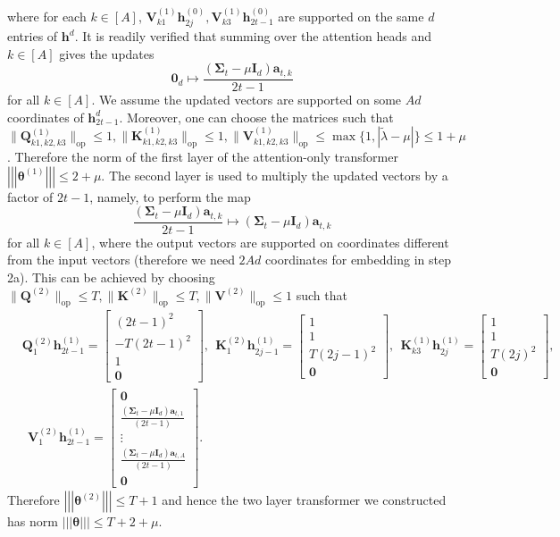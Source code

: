 \documentclass[10pt]{article}
\newcommand{\id}{\bI}
\newcommand{\lops}[1]{\|{#1}\|_{\mathrm{op}}}
\newcommand{\<}{\left\langle}
\renewcommand{\>}{\right\rangle}
\renewcommand{\bQ}{\mathbf{Q}}
\newcommand{\bzero}{{\mathbf 0}}
\newcommand{\nrmp}[1]{{\left|\!\left|\!\left|{#1}\right|\!\right|\!\right|}}
\newcommand{\partd}{{d}}
\newcommand{\Tpscov}{{{\mathbf\Sigma}}}
\newcommand{\prodeig}{{\mu}}
\def\bI{{\mathbf I}}
\def\bK{{\mathbf K}}
\def\bQ{{\mathbf Q}}
\def\bV{{\mathbf V}}
\def\btheta{{\boldsymbol \theta}}
\def\ba{{\mathbf a}}
\def\bh{{\mathbf h}}
\begin{document}
where for each $k\in[A]$, $\bV^{(1)}_{k1}\bh^{(0)}_{2j},\bV^{(1)}_{k3}\bh^{(0)}_{2t-1}$ are supported on the same $d$ entries of $\bh^\partd$.
It is readily verified that  summing over the attention heads and $k\in[A]$ gives the updates
$$ \bzero_d\mapsto\frac{(\Tpscov_t-\prodeig\id_d)\ba_{t,k}}{2t-1}$$ for all $k\in[A]$. We assume the updated vectors are supported on some $Ad$ coordinates of $\bh_{2t-1}^d$. Moreover, one can choose the matrices such that $\lops{\bQ^{(1)}_{k1,k2,k3}}\leq1,\lops{\bK^{(1)}_{k1,k2,k3}}\leq1,\lops{\bV^{(1)}_{k1,k2,k3}}\leq \max\{1,|\tilde\lambda-\prodeig|\}\leq1+\prodeig$. Therefore the norm of the first layer of the attention-only transformer $\nrmp{\btheta^{(1)}}\leq 2+\prodeig$.
The second layer is used to multiply the updated vectors by a factor of $2t-1$, namely, to perform the map
$$ \frac{(\Tpscov_t-\prodeig\id_d)\ba_{t,k}}{2t-1}\mapsto{(\Tpscov_t-\prodeig\id_d)\ba_{t,k}}$$ for all $k\in[A]$, where the output vectors are supported on coordinates different from the input vectors (therefore we need $2Ad$ coordinates for embedding in step 2a). This can be achieved by choosing $\lops{\bQ^{(2)}}\leq T, \lops{\bK^{(2)}}\leq T, \lops{\bV^{(2)}}\leq1$
such that \begin{align*}
    &
    \bQ^{(2)}_{1}\bh^{(1)}_{2t-1}=\begin{bmatrix}
         (2t-1)^2\\-T(2t-1)^2\\  1\\ \bzero
    \end{bmatrix},~~ \bK^{(2)}_{1}\bh^{(1)}_{2j-1}=\begin{bmatrix}
        1\\1\\ T(2j-1)^2\\\bzero
    \end{bmatrix},~~
    \bK^{(1)}_{k3}\bh^{(1)}_{2j}=\begin{bmatrix}
      1\\  1\\  T(2j)^2\\\bzero
    \end{bmatrix},\\&~~ \bV^{(2)}_{1}\bh^{(1)}_{2t-1}=\begin{bmatrix}
        \bzero\\ \frac{(\Tpscov_t-\prodeig\id_d)\ba_{t,1}}{(2t-1)}
\\\vdots\\
        \frac{(\Tpscov_t-\prodeig\id_d)\ba_{t,A}}{(2t-1)} \\ \bzero
    \end{bmatrix}.
\end{align*} Therefore $\nrmp{\btheta^{(2)}}\leq T+1$ and hence the two layer transformer we constructed has norm $\nrmp{\btheta}\leq T+2+\prodeig$.
\end{document}
